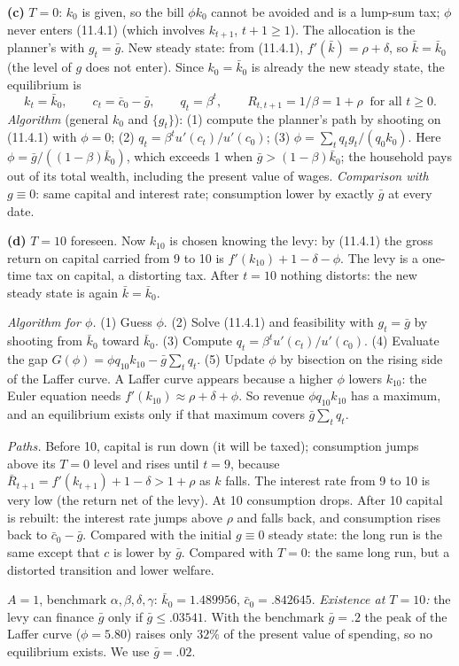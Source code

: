 \documentclass[12pt, letterpaper]{article}
\newcommand{\Rb}{\bar R}
\newcommand{\kb}{\bar k}
\newcommand{\cb}{\bar c}
\newcommand{\gb}{\bar g}
\begin{document}
\begin{tcolorbox}[evenbox,title={Exercise 11.4 \quad A capital levy}]
\textbf{(c)} $T=0$: $k_0$ is given, so the bill $\phi k_0$ cannot be avoided and is a lump-sum tax; $\phi$ never enters
(11.4.1) (which involves $k_{t+1}$, $t+1\ge1$). The allocation is the planner's with $g_t=\gb$. New steady state: from
(11.4.1), $f'(\kb)=\rho+\delta$, so $\kb=\kb_0$ (the level of $g$ does not enter). Since $k_0=\kb_0$ is already the new
steady state, the equilibrium is
\[
k_t=\kb_0,\qquad c_t=\cb_0-\gb,\qquad q_t=\beta^t,\qquad R_{t,t+1}=1/\beta=1+\rho\ \text{ for all }t\ge0 .
\]
\emph{Algorithm} (general $k_0$ and $\{g_t\}$): (1) compute the planner's path by shooting on (11.4.1) with $\phi=0$;
(2) $q_t=\beta^tu'(c_t)/u'(c_0)$; (3) $\phi=\sum_tq_tg_t/(q_0k_0)$. Here $\phi=\gb/((1-\beta)\kb_0)$, which exceeds 1
when $\gb>(1-\beta)\kb_0$; the household pays out of its total wealth, including the present value of wages.
\emph{Comparison with $g\equiv0$}: same capital and interest rate; consumption lower by exactly $\gb$ at every date.

\textbf{(d)} $T=10$ foreseen. Now $k_{10}$ is chosen knowing the levy: by (11.4.1) the gross return on capital carried
from 9 to 10 is $f'(k_{10})+1-\delta-\phi$. The levy is a one-time tax on capital, a distorting tax. After $t=10$ nothing
distorts: the new steady state is again $\kb=\kb_0$.

\emph{Algorithm for $\phi$.} (1) Guess $\phi$. (2) Solve (11.4.1) and feasibility with $g_t=\gb$ by shooting from $\kb_0$
toward $\kb_0$. (3) Compute $q_t=\beta^tu'(c_t)/u'(c_0)$. (4) Evaluate the gap $G(\phi)=\phi q_{10}k_{10}-\gb\sum_tq_t$.
(5) Update $\phi$ by bisection on the rising side of the Laffer curve. A Laffer curve appears because a higher $\phi$ lowers
$k_{10}$: the Euler equation needs $f'(k_{10})\approx\rho+\delta+\phi$. So revenue $\phi q_{10}k_{10}$ has a maximum, and
an equilibrium exists only if that maximum covers $\gb\sum_tq_t$.

\emph{Paths.} Before 10, capital is run down (it will be taxed); consumption jumps above its $T=0$ level and rises
until $t=9$, because $\Rb_{t+1}=f'(k_{t+1})+1-\delta>1+\rho$ as $k$ falls. The interest rate from 9 to 10 is very low
(the return net of the levy). At 10 consumption drops. After 10 capital is rebuilt: the interest rate jumps above $\rho$ and
falls back, and consumption rises back to $\cb_0-\gb$. Compared with the initial $g\equiv0$ steady state: the long run is
the same except that $c$ is lower by $\gb$. Compared with $T=0$: the same long run, but a distorted transition and lower
welfare.

\begin{tcolorbox}[databox]
$A=1$, benchmark $\alpha,\beta,\delta,\gamma$: $\kb_0=1.489956$, $\cb_0=.842645$.
\emph{Existence at $T=10$:} the levy can finance $\gb$ only if $\gb\le.03541$. With the benchmark $\gb=.2$ the peak of the
Laffer curve ($\phi=5.80$) raises only $32\%$ of the present value of spending, so no equilibrium exists. We use
$\gb=.02$.


\end{tcolorbox}
\end{tcolorbox}
\end{document}
